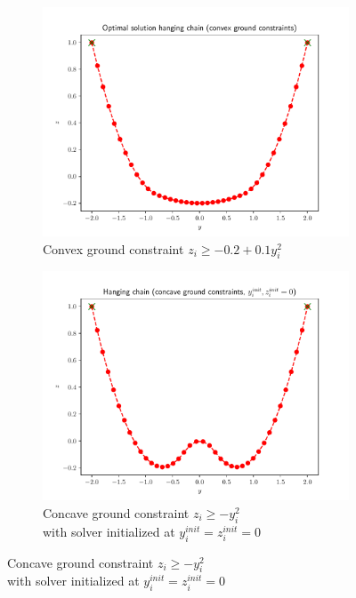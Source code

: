 \documentclass[oneside, a4paper]{book}
\begin{document}
\begin{figure}[H]
  \begin{subfigure}[t]{.5\textwidth}
    \centering
    \includegraphics[width=\linewidth]{convex.pdf}
    \caption{Convex ground constraint $z_i\geq-0.2+0.1y_i^2$}
    \label{fig:conv}
  \end{subfigure}%
  \begin{subfigure}[t]{.5\textwidth}
    \centering
    \includegraphics[width=\linewidth]{concave0.pdf}
    \caption{Concave ground constraint $z_i\geq-y_i^2$ \\with solver initialized at $y_i^{init}=z_i^{init}=0$}
    \label{fig:conc0}
  \end{subfigure}


\end{figure}
\end{document}
